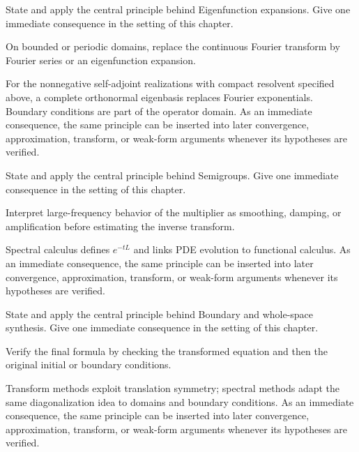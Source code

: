 \begin{exercise}\label{exr:iii28-06}
State and apply the central principle behind Eigenfunction expansions. Give one immediate consequence in the setting of this chapter.
\end{exercise}
\begin{hint}
On bounded or periodic domains, replace the continuous Fourier transform by Fourier series or an eigenfunction expansion.
\end{hint}
\begin{solution}
For the nonnegative self-adjoint realizations with compact resolvent specified above, a complete orthonormal eigenbasis replaces Fourier exponentials. Boundary conditions are part of the operator domain. As an immediate consequence, the same principle can be inserted into later convergence, approximation, transform, or weak-form arguments whenever its hypotheses are verified.
\end{solution}

\begin{exercise}\label{exr:iii28-07}
State and apply the central principle behind Semigroups. Give one immediate consequence in the setting of this chapter.
\end{exercise}
\begin{hint}
Interpret large-frequency behavior of the multiplier as smoothing, damping, or amplification before estimating the inverse transform.
\end{hint}
\begin{solution}
Spectral calculus defines $e^{-tL}$ and links PDE evolution to functional calculus. As an immediate consequence, the same principle can be inserted into later convergence, approximation, transform, or weak-form arguments whenever its hypotheses are verified.
\end{solution}

\begin{exercise}\label{exr:iii28-08}
State and apply the central principle behind Boundary and whole-space synthesis. Give one immediate consequence in the setting of this chapter.
\end{exercise}
\begin{hint}
Verify the final formula by checking the transformed equation and then the original initial or boundary conditions.
\end{hint}
\begin{solution}
Transform methods exploit translation symmetry; spectral methods adapt the same diagonalization idea to domains and boundary conditions. As an immediate consequence, the same principle can be inserted into later convergence, approximation, transform, or weak-form arguments whenever its hypotheses are verified.
\end{solution}



